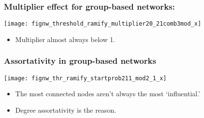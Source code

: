 
\begin{frame}
    \frametitle{Multiplier effect for group-based networks:}

    \begin{block}{}
      \centering
      \texttt{[image: fignw\_threshold\_ramify\_multiplier20\_21comb3mod\_x]}
      \begin{itemize}
      \item Multiplier almost always below 1.
      \end{itemize}
    \end{block}

\end{frame}


\begin{frame}
  \frametitle{Assortativity in group-based networks}


  \begin{block}{}
    \centering
    \texttt{[image: fignw\_thr\_ramify\_startprob211\_mod2\_1\_x]}
    \begin{itemize}
    \item<1-> The most connected nodes aren't always the most `influential.'
    \item<2-> \alert{Degree assortativity} is the reason.
    \end{itemize}
  \end{block}
  
\end{frame}

